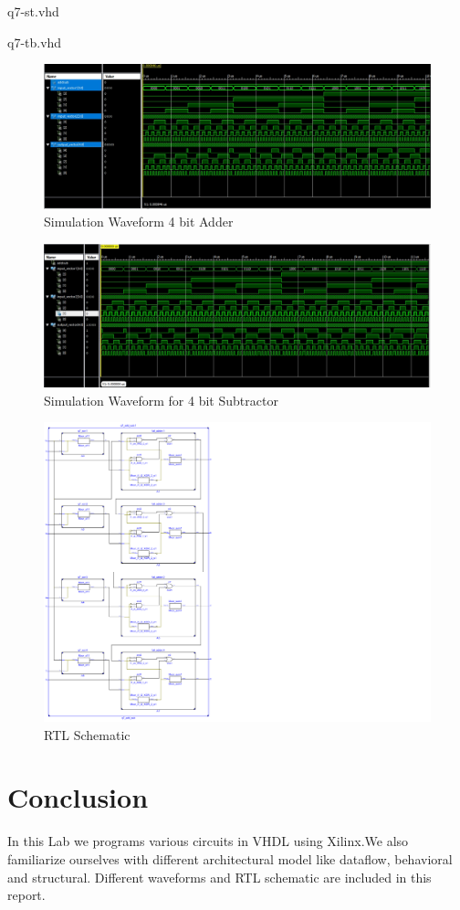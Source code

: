\documentclass{article}
\begin{document}
\HRule
{} {q7-st.vhd}
\HRule


\HRule
{} {q7-tb.vhd}
\HRule


\begin{figure}[H]
    \centering
    \includegraphics[scale=0.5,cframe=blue 0.5pt 3pt]{7aw.jpg}
    \caption{Simulation Waveform 4 bit Adder }
\end{figure}


\begin{figure}[H]
    \centering
    \includegraphics[scale=0.5,cframe=blue 0.5pt 3pt]{7sw.jpg}
    \caption{Simulation Waveform for 4 bit Subtractor }
\end{figure}

\begin{figure}[H]
    \centering
    \includegraphics[scale=1.23,cframe=blue 0.5pt 3pt]{7s.pdf}
    \caption{RTL Schematic  }
\end{figure}




\section{Conclusion}

In this Lab we programs various circuits  in VHDL using Xilinx.We also familiarize ourselves with different architectural model like dataflow, behavioral and structural. Different waveforms and RTL schematic are included in this report.
\end{document}
